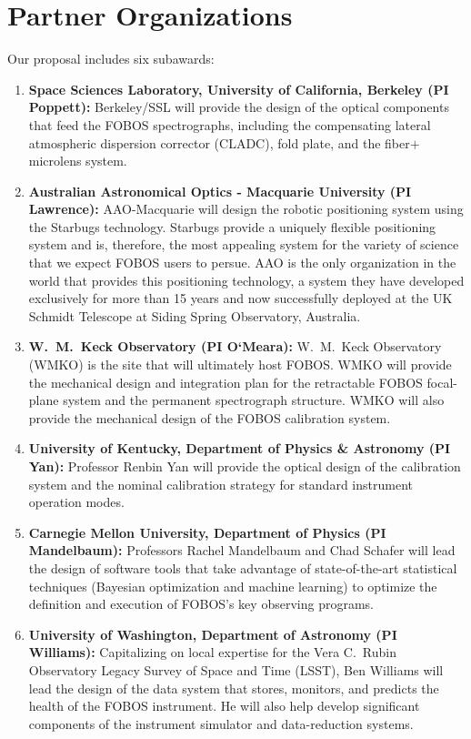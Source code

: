 \documentclass[oneside,11pt]{amsart}
\begin{document}


\vspace*{-1.5cm}

\section*{Partner Organizations}

\noindent Our proposal includes six subawards:
%
\begin{enumerate}
%
\item {\bf Space Sciences Laboratory, University of California, Berkeley
(PI Poppett):} Berkeley/SSL will provide the design of the optical
components that feed the FOBOS spectrographs, including the compensating
lateral atmospheric dispersion corrector (CLADC), fold plate, and the
fiber$+$microlens system.
%
\item {\bf Australian Astronomical Optics - Macquarie University (PI
Lawrence):} AAO-Macquarie will design the robotic positioning system
using the Starbugs technology.  Starbugs provide a uniquely flexible
positioning system and is, therefore, the most appealing system for the
variety of science that we expect FOBOS users to persue.  AAO is the
only organization in the world that provides this positioning
technology, a system they have developed exclusively for more than 15
years and now successfully deployed at the 
UK Schmidt Telescope at Siding Spring Observatory, Australia.
%
\item {\bf W.~M.~Keck Observatory (PI O`Meara):} W.~M.~Keck Observatory
(WMKO) is the site that will ultimately host FOBOS. WMKO will provide
the mechanical design and integration plan for the retractable FOBOS
focal-plane system and the permanent spectrograph structure. WMKO will
also provide the mechanical design of the FOBOS calibration system.
%
\item {\bf University of Kentucky, Department of Physics \& Astronomy
(PI Yan):} Professor Renbin Yan will provide the optical design of the
calibration system and the nominal calibration strategy for standard
instrument operation modes.
%
\item {\bf Carnegie Mellon University, Department of Physics (PI
Mandelbaum):} Professors Rachel Mandelbaum and Chad Schafer will lead
the design of software tools that take advantage of state-of-the-art
statistical techniques (Bayesian optimization and machine learning) to
optimize the definition and execution of FOBOS's key observing programs.
%
\item {\bf University of Washington, Department of Astronomy (PI
Williams):} Capitalizing on local expertise for the Vera C.\ Rubin Observatory Legacy Survey of Space and Time (LSST), Ben Williams will lead the design of the data
system that stores, monitors, and predicts the health of the FOBOS
instrument. He will also help develop significant components of the
instrument simulator and data-reduction systems.
%
\end{enumerate}
\end{document}
